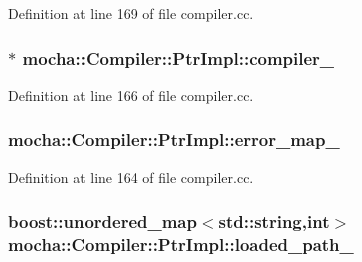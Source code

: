 Definition at line 169 of file compiler.cc.

\hypertarget{classmocha_1_1_compiler_1_1_ptr_impl_adc125764e2552f0aa8485a660154c42c}{
\subsubsection[{compiler\_\-}]{$\ast$ {\bf mocha::Compiler::PtrImpl::compiler\_\-}}}
\label{classmocha_1_1_compiler_1_1_ptr_impl_adc125764e2552f0aa8485a660154c42c}


Definition at line 166 of file compiler.cc.

\hypertarget{classmocha_1_1_compiler_1_1_ptr_impl_ad1223329a891180cf83507aa0b76d2d5}{
\subsubsection[{error\_\-map\_\-}]{ {\bf mocha::Compiler::PtrImpl::error\_\-map\_\-}}}
\label{classmocha_1_1_compiler_1_1_ptr_impl_ad1223329a891180cf83507aa0b76d2d5}


Definition at line 164 of file compiler.cc.

\hypertarget{classmocha_1_1_compiler_1_1_ptr_impl_a643001afd824defc612edd827e989347}{
\subsubsection[{loaded\_\-path\_\-}]{\setlength{\rightskip}{0pt plus 5cm}boost::unordered\_\-map$<$std::string,int$>$ {\bf mocha::Compiler::PtrImpl::loaded\_\-path\_\-}}}
\label{classmocha_1_1_compiler_1_1_ptr_impl_a643001afd824defc612edd827e989347}


